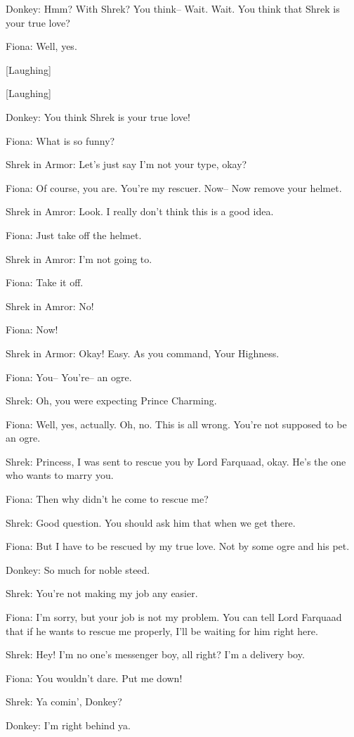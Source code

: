 \documentclass{article}
\begin{document}
Donkey:
Hmm? With Shrek? You think-- Wait. Wait. You think that Shrek is your true love?

Fiona:
Well, yes.

[Laughing]

[Laughing]

Donkey:
You think Shrek is your true love!

Fiona:
What is so funny?

Shrek in Armor:
Let's just say I'm not your type, okay?

Fiona:
Of course, you are. You're my rescuer. Now-- Now remove your helmet.

Shrek in Amror:
Look. I really don't think this is a good idea.

Fiona:
Just take off the helmet.

Shrek in Amror:
I'm not going to.

Fiona:
Take it off.

Shrek in Amror:
No!

Fiona:
Now!

Shrek in Armor:
Okay! Easy. As you command, Your Highness.

Fiona:
You-- You're-- an ogre.

Shrek:
Oh, you were expecting Prince Charming.

Fiona:
Well, yes, actually. Oh, no. This is all wrong. You're not supposed to be an ogre.

Shrek:
Princess, I was sent to rescue you by Lord Farquaad, okay. He's the one who wants to marry you.

Fiona:
Then why didn't he come to rescue me?

Shrek:
Good question. You should ask him that when we get there.

Fiona:
But I have to be rescued by my true love. Not by some ogre and his pet.

Donkey:
So much for noble steed.

Shrek:
You're not making my job any easier.

Fiona:
I'm sorry, but your job is not my problem. You can tell Lord Farquaad that if he wants to rescue me properly, I'll be waiting for him right here.

Shrek:
Hey! I'm no one's messenger boy, all right? I'm a delivery boy.

Fiona:
You wouldn't dare. Put me down!

Shrek:
Ya comin', Donkey?

Donkey:
I'm right behind ya.
\end{document}
